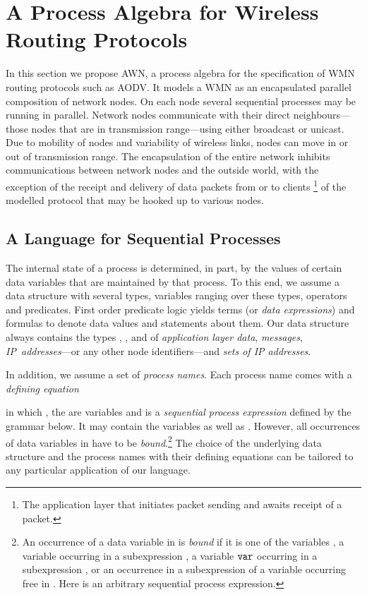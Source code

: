 \documentclass[envcountsame,envcountsect,orivec,runningheads]{llncs}
\newcommand{\awn}{AWN\xspace}
\renewcommand{\keyw}[1]{\ensuremath{{\tt #1}}}
\begin{document}
\section{A Process Algebra for Wireless Routing Protocols}\label{sec:process_algebra}
In this section we propose \awn, a process algebra for the specification of WMN routing
protocols such as AODV\@. It models a WMN as an encapsulated
parallel composition of network nodes. On each node several sequential
processes may be running in parallel.  Network nodes communicate with
their direct neighbours---those nodes that are in transmission
range---using either broadcast or unicast.  Due to mobility of nodes and 
variability of wireless links, nodes can move in or out of transmission
range. The encapsulation of the entire network inhibits communications 
between network nodes and the outside world, with the exception of the 
receipt and delivery of data packets from or to clients
\footnote{The application layer that initiates packet sending
  and awaits receipt of a packet.}  of the modelled protocol that may
be hooked up to various nodes.

\subsection{A Language for Sequential Processes}
The internal state of a process is determined, in part, by the values
of certain data variables that are maintained by that process.  To
this end, we assume a data structure with several types, variables
ranging over these types, operators and predicates.  First order
predicate logic yields terms (or \emph{data expressions}) and formulas
to denote data values and statements about them. Our data structure
always contains the types \tDATA, \tMSG, {\tIP} and  of
\emph{application layer data}, \emph{messages}, \mbox{\emph{IP addresses}}---or any
other node identifiers---and \emph{sets of IP addresses}.

In addition, we assume a set of \emph{process names}.
Each process name  comes with a \emph{defining equation}
\vspace{-2ex}

in which , the  are variables and  is a
\emph{sequential process expression} defined by the grammar below. It
may contain the variables  as well as . However, all
occurrences of data variables in  have to be
\emph{bound}.\footnote{An occurrence of a data variable in  is
  \emph{bound} if it is one of the variables , a
  variable {\msg} occurring in a subexpression , a
  variable \keyw{var} occurring in a subexpression
  , or an occurrence
  in a subexpression  of a variable occurring free
  in .  Here  is an arbitrary sequential process
  expression.}  The choice of the underlying data structure and the
process names with their defining equations can be tailored to any
particular application of our language.
\end{document}
